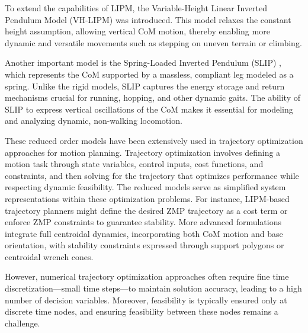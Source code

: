 \documentclass[main.tex]{subfiles}
\begin{document}
To extend the capabilities of LIPM, the Variable-Height Linear Inverted Pendulum Model (VH-LIPM) \cite{VHLIPM} was introduced. This model relaxes the constant height assumption, allowing vertical CoM motion, thereby enabling more dynamic and versatile movements such as stepping on uneven terrain or climbing.

Another important model is the Spring-Loaded Inverted Pendulum (SLIP) \cite{SLIP}, which represents the CoM supported by a massless, compliant leg modeled as a spring. Unlike the rigid models, SLIP captures the energy storage and return mechanisms crucial for running, hopping, and other dynamic gaits. The ability of SLIP to express vertical oscillations of the CoM makes it essential for modeling and analyzing dynamic, non-walking locomotion.

These reduced order models have been extensively used in trajectory optimization approaches for motion planning. Trajectory optimization involves defining a motion task through state variables, control inputs, cost functions, and constraints, and then solving for the trajectory that optimizes performance while respecting dynamic feasibility. The reduced models serve as simplified system representations within these optimization problems. For instance, LIPM-based trajectory planners might define the desired ZMP trajectory as a cost term or enforce ZMP constraints to guarantee stability. More advanced formulations integrate full centroidal dynamics, incorporating both CoM motion and base orientation, with stability constraints expressed through support polygons or centroidal wrench cones.

However, numerical trajectory optimization approaches often require fine time discretization—small time steps—to maintain solution accuracy, leading to a high number of decision variables. Moreover, feasibility is typically ensured only at discrete time nodes, and ensuring feasibility between these nodes remains a challenge.
\end{document}
